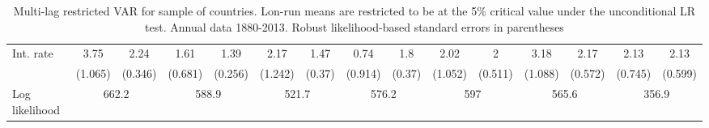 \begin{table}[htbp]
\begin{tabular}{@{\extracolsep{4pt}}lcccccccccccccc@{}}
\quad Int. rate 	 &3.75 	 & 2.24 	 & 1.61 	 & 1.39 	 & 2.17 	 & 1.47 	 & 0.74 	 & 1.8 	 & 2.02 	 & 2 	 & 3.18 	 & 2.17 	 & 2.13 	 & 2.13	 \\ 
 		 & (1.065) 	 & (0.346) 	 & (0.681) 	 & (0.256) 	 & (1.242) 	 & (0.37) 	 & (0.914) 	 & (0.37) 	 & (1.052) 	 & (0.511) 	 & (1.088) 	 & (0.572) 	 & (0.745) 	 & (0.599) 	 \\ 
 \hline \rule{0pt}{4ex} 
  Log likelihood 	 &\multicolumn{2}{c}{662.2} 	 & \multicolumn{2}{c}{588.9} 	 & \multicolumn{2}{c}{521.7} 	 & \multicolumn{2}{c}{576.2} 	 & \multicolumn{2}{c}{597} 	 & \multicolumn{2}{c}{565.6} 	 & \multicolumn{2}{c}{356.9}\\ 

 \hline 	\end{tabular}		\caption{Multi-lag restricted VAR for sample of countries. Lon-run means are
                            restricted to be at the 5\% critical value under the unconditional
                            LR test. Annual data 1880-2013. Robust likelihood-based standard errors in parentheses}
		\label{tab:all_rest_4lag}

\end{table}